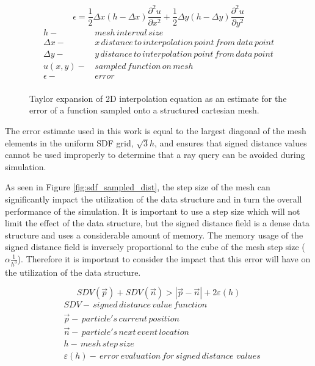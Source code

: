 \begin{figure}[H]
  \begin{equation}
    \epsilon = \frac{1}{2} \Delta x (h-\Delta x) \frac{\partial^2 u}{\partial x^2} + \frac{1}{2} \Delta y (h-\Delta y)  \frac{\partial^2 u}{\partial y^2}
  \end{equation}
  \begin{align*}
    h - & \, mesh\, interval\, size \\
    \Delta x - & \, x\, distance\, to\, interpolation\, point\, from\, data\, point \\
    \Delta y - & \, y\, distance\, to\, interpolation\, point\, from\, data\, point \\
    u(x,y) - &\, sampled\, function\, on\, mesh \\
    \epsilon - & \, error \\
  \end{align*}
  \caption{Taylor expansion of 2D interpolation equation as an estimate for the error of a function sampled onto a structured cartesian mesh.}
  \label{fig:interpolation_err_2d}
\end{figure}

The error estimate used in this work is equal to the largest diagonal of the
mesh elements in the uniform SDF grid, $\sqrt{3}h$, and ensures that signed
distance values cannot be used improperly to determine that a ray query can be
avoided during simulation.


As seen in Figure \ref{fig:sdf_sampled_dist}, the step size of the mesh can
significantly impact the utilization of the data structure and in turn the
overall performance of the simulation. It is important to use a step size which
will not limit the effect of the data structure, but the signed
distance field is a dense data structure and uses a considerable amount of
memory. The memory usage of the signed distance field is inversely proportional
to the cube of the mesh step size ($\alpha \frac{1}{h^{3}}$). Therefore it is
important to consider the impact that this error will have on the utilization
of the data structure.

\begin{equation}
  SDV(\vec{p}) + SDV(\vec{n}) > |\vec{p}-\vec{n}| + 2\varepsilon(h)
  \label{eq:condition}
\end{equation}
\begin{align*}
 &SDV - \, signed \, distance \, value \, function \\
 &\vec{p} - \, particle's \, current \, position \\
 &\vec{n} - \, particle's \, next \, event \, location \\
 &h - \, mesh \, step \, size \\
 &\varepsilon(h) - \, error \, evaluation \, for \, signed \, distance \, \, values \\
\end{align*}

